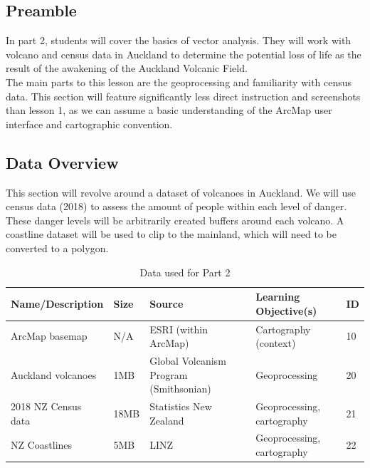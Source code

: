 \documentclass{article}
\begin{document}
\subsection{Preamble}
In part 2, students will cover the basics of vector analysis. They will work with volcano and census data in Auckland to determine the potential loss of life as the result of the awakening of the Auckland Volcanic Field. \\

The main parts to this lesson are the geoprocessing and familiarity with census data. This section will feature significantly less direct instruction and screenshots than lesson 1, as we can assume a basic understanding of the ArcMap user interface and cartographic convention.

\subsection{Data Overview}
This section will revolve around a dataset of volcanoes in Auckland. We will use census data (2018) to assess the amount of people within each level of danger. These danger levels will be arbitrarily created buffers around each volcano. A coastline dataset will be used to clip to the mainland, which will need to be converted to a polygon. \\

\begin{table}[h]
\begin{center}
    \begin{tabular}{ | m{4cm} | m{1cm}| m{3.5cm} | m{5cm} | m{1cm} | } 
    \hline
    \cellcolor{red!35!blue!33!green!33!}\textbf{Name/Description} & 
    \cellcolor{red!35!blue!33!green!33!}\textbf{Size} &
    \cellcolor{red!35!blue!33!green!33!}\textbf{Source} &
    \cellcolor{red!35!blue!33!green!33!}\textbf{Learning Objective(s)} &
    \cellcolor{red!35!blue!33!green!33!}\textbf{ID} \\
    \hline
    ArcMap basemap & N/A & ESRI (within ArcMap) & Cartography (context) & 10 \\
    \hline
    Auckland volcanoes & 1MB & Global Volcanism Program (Smithsonian) & Geoprocessing & 20 \\
    \hline
    2018 NZ Census data & 18MB & Statistics New Zealand & Geoprocessing, cartography & 21 \\
    \hline
    NZ Coastlines & 5MB & LINZ & Geoprocessing, cartography & 22 \\
    \hline
    \end{tabular}
\end{center}
\caption{\label{tb_data_2}Data used for Part 2}
\end{table}
\end{document}
